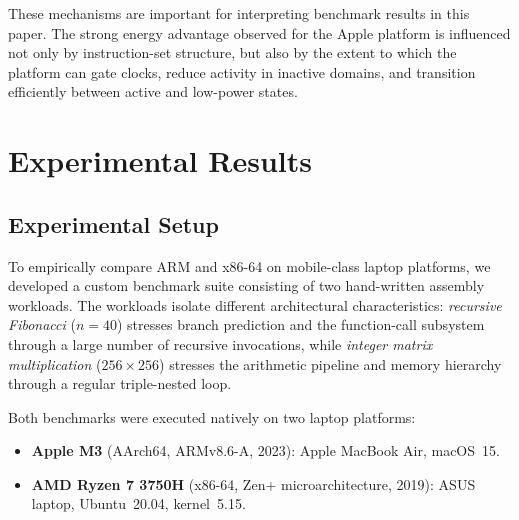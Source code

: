 \documentclass{tcsa}
\begin{document}
These mechanisms are important for interpreting benchmark results in this paper. 
The strong energy advantage observed for the Apple platform is influenced not only by 
instruction-set structure, but also by the extent to which the platform can gate 
clocks, reduce activity in inactive domains, and transition efficiently between 
active and low-power states.



\section{Experimental Results}
\label{sec:results}

\subsection{Experimental Setup}
\label{sec:setup}

To empirically compare ARM and x86-64 on mobile-class laptop platforms,
we developed a custom benchmark suite consisting of two hand-written
assembly workloads. The workloads isolate different architectural
characteristics: \emph{recursive Fibonacci} ($n=40$) stresses branch
prediction and the function-call subsystem through a large number of
recursive invocations, while \emph{integer matrix multiplication}
($256\times256$) stresses the arithmetic pipeline and memory hierarchy
through a regular triple-nested loop.

Both benchmarks were executed natively on two laptop platforms:

\begin{itemize}
  \item \textbf{Apple M3} (AArch64, ARMv8.6-A, 2023): Apple MacBook Air,
        macOS~15.
  \item \textbf{AMD Ryzen 7 3750H} (x86-64, Zen+ microarchitecture,
        2019): ASUS laptop, Ubuntu~20.04, kernel~5.15.
\end{itemize}
\end{document}
